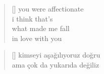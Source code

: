 \documentclass[10pt, openright, twoside]{memoir}
\theoremstyle{definition}
\begin{document}
\vspace*{\fill}
%
\newpage
{}
\vspace*{\fill}
\settowidth{\versewidth}{you were affectionate}
\begin{verse}[\versewidth]
  you were affectionate \\
  i think that's \\
  what made me fall \\
  in love with you \\
\end{verse}
\vspace*{\fill}
%
\newpage
{}
\vspace*{\fill}
\settowidth{\versewidth}{ama çok da yukarıda değiliz}
\begin{verse}[\versewidth]
  kimseyi aşağılıyoruz doğru \\
  ama çok da yukarıda değiliz \\
\end{verse}
\vspace*{\fill}
%
\newpage
{}
\vspace*{\fill}
\settowidth{\versewidth}{geriye kaldı defterde belirsiz on bir sayfa}
\end{document}
